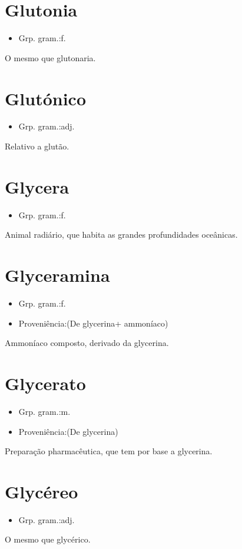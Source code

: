 \section{Glutonia}
\begin{itemize}
\item {Grp. gram.:f.}
\end{itemize}
O mesmo que \textunderscore glutonaria\textunderscore .
\section{Glutónico}
\begin{itemize}
\item {Grp. gram.:adj.}
\end{itemize}
Relativo a glutão.
\section{Glycera}
\begin{itemize}
\item {Grp. gram.:f.}
\end{itemize}
Animal radiário, que habita as grandes profundidades oceânicas.
\section{Glyceramina}
\begin{itemize}
\item {Grp. gram.:f.}
\end{itemize}
\begin{itemize}
\item {Proveniência:(De \textunderscore glycerina\textunderscore  + \textunderscore ammoníaco\textunderscore )}
\end{itemize}
Ammoníaco composto, derivado da glycerina.
\section{Glycerato}
\begin{itemize}
\item {Grp. gram.:m.}
\end{itemize}
\begin{itemize}
\item {Proveniência:(De \textunderscore glycerina\textunderscore )}
\end{itemize}
Preparação pharmacêutica, que tem por base a glycerina.
\section{Glycéreo}
\begin{itemize}
\item {Grp. gram.:adj.}
\end{itemize}
O mesmo que \textunderscore glycérico\textunderscore .
